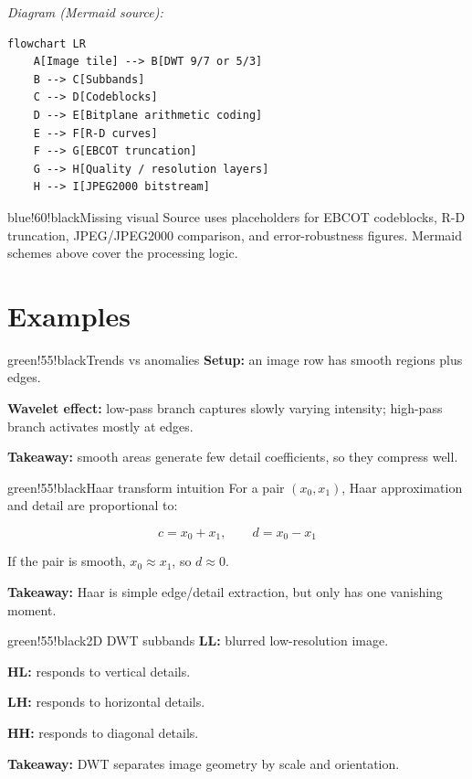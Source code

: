 \begin{center}\footnotesize\itshape Diagram (Mermaid source):\end{center}
\begin{verbatim}
flowchart LR
    A[Image tile] --> B[DWT 9/7 or 5/3]
    B --> C[Subbands]
    C --> D[Codeblocks]
    D --> E[Bitplane arithmetic coding]
    E --> F[R-D curves]
    F --> G[EBCOT truncation]
    G --> H[Quality / resolution layers]
    H --> I[JPEG2000 bitstream]
\end{verbatim}

\begin{calloutbox}{blue!60!black}{Missing visual}
Source uses placeholders for EBCOT codeblocks, R-D truncation, JPEG/JPEG2000 comparison, and error-robustness figures. Mermaid schemes above cover the processing logic.
\end{calloutbox}

\section{Examples}

\begin{calloutbox}{green!55!black}{Trends vs anomalies}
\textbf{Setup:} an image row has smooth regions plus edges.

\textbf{Wavelet effect:} low-pass branch captures slowly varying intensity; high-pass branch activates mostly at edges.

\textbf{Takeaway:} smooth areas generate few detail coefficients, so they compress well.
\end{calloutbox}

\begin{calloutbox}{green!55!black}{Haar transform intuition}
For a pair $(x_0,x_1)$, Haar approximation and detail are proportional to:

\[
c=x_0+x_1,\qquad d=x_0-x_1
\]

If the pair is smooth, $x_0\approx x_1$, so $d\approx0$.

\textbf{Takeaway:} Haar is simple edge/detail extraction, but only has one vanishing moment.
\end{calloutbox}

\begin{calloutbox}{green!55!black}{2D DWT subbands}
\textbf{LL:} blurred low-resolution image.

\textbf{HL:} responds to vertical details.

\textbf{LH:} responds to horizontal details.

\textbf{HH:} responds to diagonal details.

\textbf{Takeaway:} DWT separates image geometry by scale and orientation.
\end{calloutbox}

